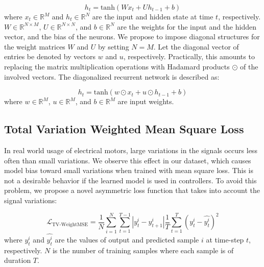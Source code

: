 \documentclass[letterpaper]{article}
\begin{document}
\begin{equation}
    h_t = \text{tanh}(Wx_t + Uh_{t-1} + b)
\end{equation}
where $x_t \in \mathbb{R}^M$ and $h_t \in \mathbb{R}^N$ are the input and hidden state at time $t$, respectively. $W \in \mathbb{R}^{N \times M}$, $U \in \mathbb{R}^{N \times N}$, and $b \in \mathbb{R}^N$ are the weights for the input and the hidden vector, and the bias of the neurons. We propose to impose diagonal structures for the weight matrices $W$ and $U$ by setting $N=M$. Let the diagonal vector of entries be denoted by vectors $w$ and $u$, respectively. Practically, this amounts to replacing the matrix multiplication operations with Hadamard products $\odot$ of the involved vectors. The diagonalized recurrent network is described as:

\begin{equation}
    h_t = \text{tanh}(w \odot x_t + u \odot h_{t-1} + b)
\end{equation}
where $w \in \mathbb{R}^M$, $u \in \mathbb{R}^M$, and $b \in \mathbb{R}^M$ are input weights.

\subsection{Total Variation Weighted Mean Square Loss}
In real world usage of electrical motors, large variations in the signals occurs less often than small variations. We observe this effect in our dataset, which causes model bias toward small variations when trained with mean square loss. This is not a desirable behavior if the learned model is used in controllers. To avoid this problem, we propose a novel asymmetric loss function that takes into account the signal variations:

\begin{equation}
    \mathcal{L}_{\text{TV-WeightMSE}} = \frac{1}{N}\sum_{i=1}^{N}\sum_{t=1}^{T-1} |y^i_t - y^i_{t+1}| \frac{1}{T}\sum^{T}_{t=1}(y^i_t - \hat{y^i_t})^2
\end{equation}
where $y^i_t$ and $\hat{y^i_t}$ are the values of output and predicted sample $i$ at time-step $t$, respectively. $N$ is the number of training samples where each sample is of duration $T$.
\end{document}
